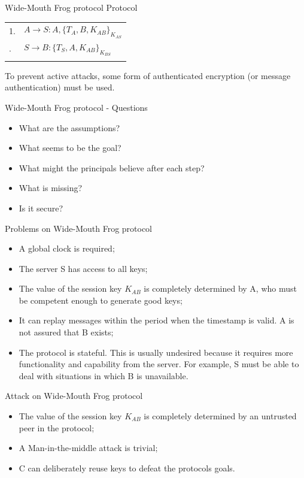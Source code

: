 \documentclass[12pt,table,xcolor={dvipsnames}]{beamer}
\begin{document}
\begin{frame}{Wide-Mouth Frog protocol Protocol}
\begin{table}[htdp]
\begin{center}
\begin{tabular}{ l l }
1. & $A\rightarrow S:A,\{T_{A},B,K_{{AB}}\}_{{K_{{AS}}}}$ \\\pause
2. & $S\rightarrow B:\{T_{S},A,K_{{AB}}\}_{{K_{{BS}}}}$ \\\pause
\end{tabular}
\end{center}
\end{table}%
To prevent active attacks, some form of authenticated encryption (or message authentication) must be used.
\end{frame}


\begin{frame}{Wide-Mouth Frog protocol - Questions}
\begin{itemize}
\item What are the assumptions? \pause
\item What seems to be the goal?\pause 
\item What might the principals believe after each step?\pause
\item What is missing?\pause
\item Is it secure?
\end{itemize}
\end{frame}

\begin{frame}{Problems on Wide-Mouth Frog protocol}
\begin{itemize}
\item A global clock is required;\pause
\item The server S has access to all keys;\pause
\item The value of the session key $K_{AB}$ is completely determined by A, who must be competent enough to generate good keys;\pause
\item It can replay messages within the period when the timestamp is valid. A is not assured that B exists;\pause
\item The protocol is stateful. This is usually undesired because it requires more functionality and capability from the server. For example, S must be able to deal with situations in which B is unavailable.
\end{itemize}
\end{frame}

\begin{frame}{Attack on Wide-Mouth Frog protocol}
\begin{itemize}
\item The value of the session key $K_{AB}$ is completely determined by an untrusted peer in the protocol;\pause
\item A Man-in-the-middle attack is trivial;\pause
\item C can deliberately reuse keys to defeat the protocols goals.
\end{itemize}
\end{frame}
\end{document}
